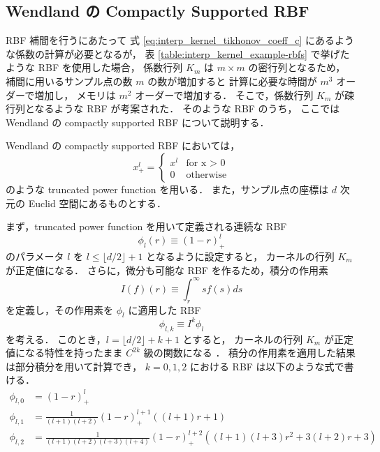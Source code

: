 \subsection{Wendland の Compactly Supported RBF}

RBF 補間を行うにあたって
式 \eqref{eq:interp_kernel_tikhonov_coeff_c} にあるような係数の計算が必要となるが，
表 \ref{table:interp_kernel_example-rbfs}
で挙げたような RBF を使用した場合，
係数行列 $K_m$ は $m \times m$ の密行列となるため，
補間に用いるサンプル点の数 $m$ の数が増加すると
計算に必要な時間が $m^3$ オーダーで増加し，
メモリは $m^2$ オーダーで増加する．
そこで，係数行列 $K_m$ が疎行列となるような RBF が考案された．
そのような RBF のうち，
ここでは Wendland の compactly supported RBF \cite{Wendland1995} について説明する．

Wendland の compactly supported RBF においては，
\begin{equation}
    x_+^l = \begin{cases}
        x^l & \text{for x > 0} \\
        0   & \text{otherwise}
    \end{cases}
\end{equation}
のような truncated power function を用いる．
また，サンプル点の座標は $d$ 次元の Euclid 空間にあるものとする．

まず，truncated power function を用いて定義される連続な RBF
\begin{equation}
    \phi_l(r) \equiv (1 - r)_+^l
\end{equation}
のパラメータ $l$ を $l \le \lfloor d/2 \rfloor + 1$ となるように設定すると，
カーネルの行列 $K_m$ が正定値になる．
さらに，微分も可能な RBF を作るため，積分の作用素
\begin{equation}
    I(f)(r) \equiv \int_r^\infty sf(s) ds
\end{equation}
を定義し，その作用素を $\phi_l$ に適用した RBF
\begin{equation}
    \phi_{l,k} \equiv I^k \phi_l
\end{equation}
を考える．
このとき，$l = \lfloor d/2 \rfloor + k + 1$ とすると，
カーネルの行列 $K_m$ が正定値になる特性を持ったまま
$C^{2k}$ 級の関数になる \cite[Theorem 3.5]{Wendland1995}．
積分の作用素を適用した結果は部分積分を用いて計算でき，
$k = 0, 1, 2$ における RBF は以下のような式で書ける．
\begin{align}
    \phi_{l,0} & = (1 - r)_+^l                                                    \\
    \phi_{l,1} & = \frac{1}{(l+1)(l+2)} (1 - r)_+^{l+1} \left( (l+1)r + 1 \right) \\
    \phi_{l,2} & = \frac{1}{(l+1)(l+2)(l+3)(l+4)} (1 - r)_+^{l+2}
    \left( (l+1)(l+3)r^2 + 3(l+2)r + 3 \right)
\end{align}

